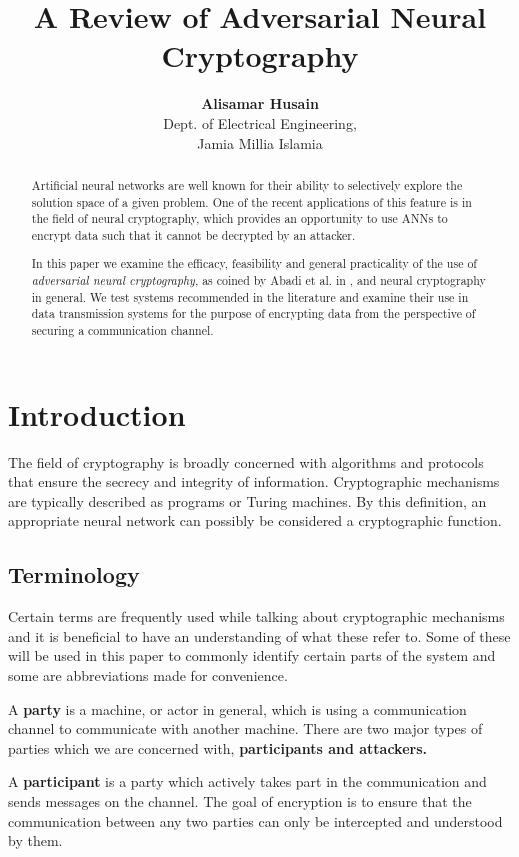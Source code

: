 \documentclass{proc}
\title{A Review of Adversarial Neural Cryptography}
\author{
  {\bf Alisamar Husain}\\
  Dept. of Electrical Engineering, \\
  Jamia Millia Islamia
}
\begin{document}
  \maketitle

  \begin{abstract}
    Artificial neural networks are well known for their ability to selectively 
    explore the solution space of a given problem.
    One of the recent applications of this feature is in the field of neural 
    cryptography, which provides an opportunity to use ANNs to encrypt data 
    such that it cannot be decrypted by an attacker.

    In this paper we examine the efficacy, feasibility and 
    general practicality of the use of {\it adversarial neural cryptography}, 
    as coined by Abadi et al. in \cite{seminalanc}, and neural cryptography
    in general. We test systems recommended in the literature and examine their 
    use in data transmission systems for the purpose of encrypting data from
    the perspective of securing a communication channel.
  \end{abstract}
 
  \section{Introduction}
  The field of cryptography is broadly concerned with algorithms and protocols 
  that ensure the secrecy and integrity of information. Cryptographic mechanisms are 
  typically described as programs or Turing machines. By this definition, an
  appropriate neural network can possibly be considered a cryptographic function.

    \subsection{Terminology}
    Certain terms are frequently used while talking about cryptographic mechanisms
    and it is beneficial to have an understanding of what these refer to. Some
    of these will be used in this paper to commonly identify certain parts of the 
    system and some are abbreviations made for convenience.

    A {\bf party} is a machine, or actor in general, which is using a communication
    channel to communicate with another machine. There are two major types of parties
    which we are concerned with, {\bf participants and attackers.}
    
    A {\bf participant} is a party which actively takes part in the communication and
    sends messages on the channel. The goal of encryption is to ensure that the 
    communication between any two parties can only be intercepted and understood 
    by them.
\end{document}
